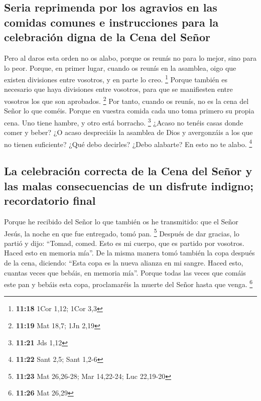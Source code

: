 \begin{paracol}{2}
{\subsection{Seria reprimenda por los agravios en las comidas comunes e
instrucciones para la celebración digna de la Cena del
Señor}\label{seria-reprimenda-por-los-agravios-en-las-comidas-comunes-e-instrucciones-para-la-celebraciuxf3n-digna-de-la-cena-del-seuxf1or}}

 Pero al daros esta orden no os alabo, porque os reunís
no para lo mejor, sino para lo peor.  Porque, en primer
lugar, cuando os reunís en la asamblea, oigo que existen divisiones
entre vosotros, y en parte lo creo. \footnote{\textbf{11:18} 1Cor 1,12;
  1Cor 3,3}  Porque también es necesario que haya
divisiones entre vosotros, para que se manifiesten entre vosotros los
que son aprobados. \footnote{\textbf{11:19} Mat 18,7; 1Jn 2,19}
 Por tanto, cuando os reunís, no es la cena del Señor lo
que coméis.  Porque en vuestra comida cada uno toma
primero su propia cena. Uno tiene hambre, y otro está borracho.
\footnote{\textbf{11:21} Jds 1,12}  ¿Acaso no tenéis
casas donde comer y beber? ¿O acaso despreciáis la asamblea de Dios y
avergonzáis a los que no tienen suficiente? ¿Qué debo decirles? ¿Debo
alabarte? En esto no te alabo. \footnote{\textbf{11:22} Sant 2,5; Sant
  1,2-6}

\hypertarget{la-celebraciuxf3n-correcta-de-la-cena-del-seuxf1or-y-las-malas-consecuencias-de-un-disfrute-indigno-recordatorio-final}{%
\subsection{La celebración correcta de la Cena del Señor y las malas
consecuencias de un disfrute indigno; recordatorio
final}\label{la-celebraciuxf3n-correcta-de-la-cena-del-seuxf1or-y-las-malas-consecuencias-de-un-disfrute-indigno-recordatorio-final}}

 Porque he recibido del Señor lo que también os he
transmitido: que el Señor Jesús, la noche en que fue entregado, tomó
pan. \footnote{\textbf{11:23} Mat 26,26-28; Mar 14,22-24; Luc 22,19-20}
 Después de dar gracias, lo partió y dijo: ``Tomad,
comed. Esto es mi cuerpo, que es partido por vosotros. Haced esto en
memoria mía''.  De la misma manera tomó también la copa
después de la cena, diciendo: ``Esta copa es la nueva alianza en mi
sangre. Haced esto, cuantas veces que bebáis, en memoria mía''.
 Porque todas las veces que comáis este pan y bebáis esta
copa, proclamaréis la muerte del Señor hasta que venga. \footnote{\textbf{11:26}
  Mat 26,29}


\end{paracol}
